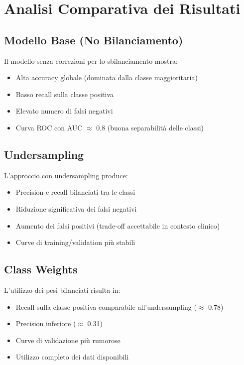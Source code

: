 \section{Analisi Comparativa dei Risultati}

\subsection{Modello Base (No Bilanciamento)}

Il modello senza correzioni per lo sbilanciamento mostra:
\begin{itemize}
    \item Alta accuracy globale (dominata dalla classe maggioritaria)
    \item Basso recall sulla classe positiva
    \item Elevato numero di falsi negativi
    \item Curva ROC con AUC $\approx$ 0.8 (buona separabilità delle classi)
\end{itemize}

\subsection{Undersampling}

L'approccio con undersampling produce:
\begin{itemize}
    \item Precision e recall bilanciati tra le classi
    \item Riduzione significativa dei falsi negativi
    \item Aumento dei falsi positivi (trade-off accettabile in contesto clinico)
    \item Curve di training/validation più stabili
\end{itemize}

\subsection{Class Weights}

L'utilizzo dei pesi bilanciati risulta in:
\begin{itemize}
    \item Recall sulla classe positiva comparabile all'undersampling ($\approx$ 0.78)
    \item Precision inferiore ($\approx$ 0.31)
    \item Curve di validazione più rumorose
    \item Utilizzo completo dei dati disponibili
\end{itemize}

